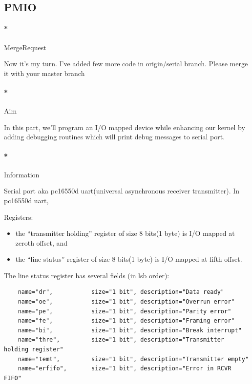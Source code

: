 \documentclass[]{article}
\newenvironment{Shaded}{}{}
\newcommand{\ExtensionTok}[1]{{#1}}
\newcommand{\NormalTok}[1]{{#1}}
\providecommand{\tightlist}{%
  \setlength{\itemsep}{0pt}\setlength{\parskip}{0pt}}
\let\oldparagraph\paragraph
\renewcommand{\paragraph}[1]{\oldparagraph{#1}\mbox{}}
\begin{document}
\subsection{PMIO}\label{pmio}

\paragraph*{MergeRequest}\label{mergerequest-1}

Now it's my turn. I've added few more code in origin/serial branch.
Please merge it with your master branch

\begin{Shaded}
\end{Shaded}

\paragraph*{Aim}\label{aim-1}

In this part, we'll program an I/O mapped device while enhancing our
kernel by adding debugging routines which will print debug messages to
serial port.

\paragraph*{Information}\label{information-1}

Serial port aka pc16550d uart(universal asynchronous receiver
transmitter). In pc16550d uart,

Registers:

\begin{itemize}
\tightlist
\item
  the ``transmitter holding'' register of size 8 bits(1 byte) is I/O
  mapped at zeroth offset, and
\item
  the ``line status'' register of size 8 bits(1 byte) is I/O mapped at
  fifth offset.
\end{itemize}

The line status register has several fields (in lsb order):

\begin{verbatim}
    name="dr",           size="1 bit", description="Data ready"
    name="oe",           size="1 bit", description="Overrun error"
    name="pe",           size="1 bit", description="Parity error"
    name="fe",           size="1 bit", description="Framing error"
    name="bi",           size="1 bit", description="Break interrupt"
    name="thre",         size="1 bit", description="Transmitter holding register"
    name="temt",         size="1 bit", description="Transmitter empty"
    name="erfifo",       size="1 bit", description="Error in RCVR FIFO"
\end{verbatim}
\end{document}
